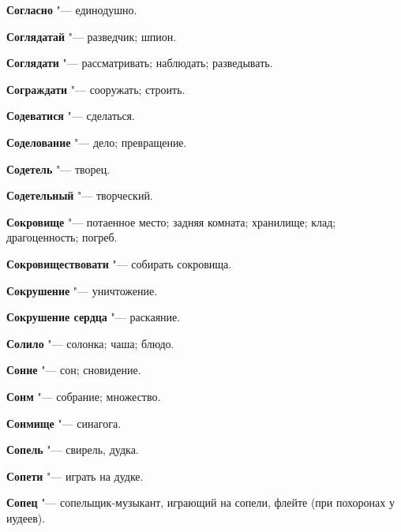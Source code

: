\begin{mymulticols}{2}
\noindent\textbf{Согласно} "--- единодушно. 




\noindent\textbf{Соглядатай} "--- разведчик; шпион. 




\noindent\textbf{Соглядати} "--- рассматривать; наблюдать; разведывать. 




\noindent\textbf{Сограждати} "--- сооружать; строить. 




\noindent\textbf{Содеватися} "--- сделаться. 




\noindent\textbf{Соделование} "--- дело; превращение. 




\noindent\textbf{Содетель} "--- творец. 




\noindent\textbf{Содетельный} "--- творческий. 




\noindent\textbf{Сокровище} "--- потаенное место; задняя комната; хранилище; клад; драгоценность; погреб. 




\noindent\textbf{Сокровиществовати} "--- собирать сокровища. 




\noindent\textbf{Сокрушение} "--- уничтожение. 




\noindent\textbf{Сокрушение сердца} "--- раскаяние. 




\noindent\textbf{Солило} "--- солонка; чаша; блюдо. 




\noindent\textbf{Соние} "--- сон; сновидение. 




\noindent\textbf{Сонм} "--- собрание; множество. 




\noindent\textbf{Сонмище} "--- синагога. 




\noindent\textbf{Сопель} "--- свирель, дудка. 




\noindent\textbf{Сопети} "--- играть на дудке. 




\noindent\textbf{Сопец} "--- сопельщик-музыкант, играющий на сопели, флейте (при похоронах у иудеев). 





\end{mymulticols}
